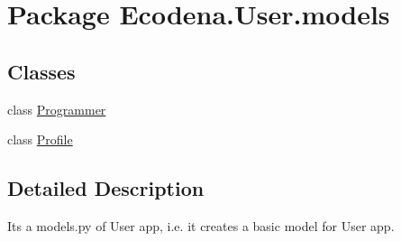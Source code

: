 \hypertarget{namespace_ecodena_1_1_user_1_1models}{
\section{Package Ecodena.User.models}
\label{d5/de0/namespace_ecodena_1_1_user_1_1models}
}
\subsection*{Classes}
\begin{DoxyCompactItemize}
\item 
class \hyperlink{class_ecodena_1_1_user_1_1models_1_1_programmer}{Programmer}
\item 
class \hyperlink{class_ecodena_1_1_user_1_1models_1_1_profile}{Profile}
\end{DoxyCompactItemize}


\subsection{Detailed Description}
\begin{DoxyVerb}Its a models.py of User app, i.e. it creates a basic model for User app.\end{DoxyVerb}
 
